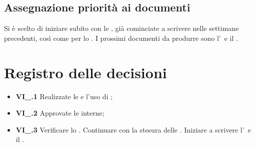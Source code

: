 \subsection{Assegnazione priorità ai documenti}
Si è scelto di iniziare subito con le \NdP, già cominciate a scrivere nelle settimane precedenti, così come per lo \SdF. I prossimi documenti da produrre sono l'\AdR\ e il \PdP.

\section{Registro delle decisioni}
\begin{itemize}
  \item \textbf{VI\_\Data.1} Realizzate le   e l'uso di ;
  \item \textbf{VI\_\Data.2} Approvate le  interne;
  \item \textbf{VI\_\Data.3} Verificare lo \SdF. Continuare con la stesura delle \NdP. Iniziare a scrivere l'\AdR\ e il \PdP.
\end{itemize}